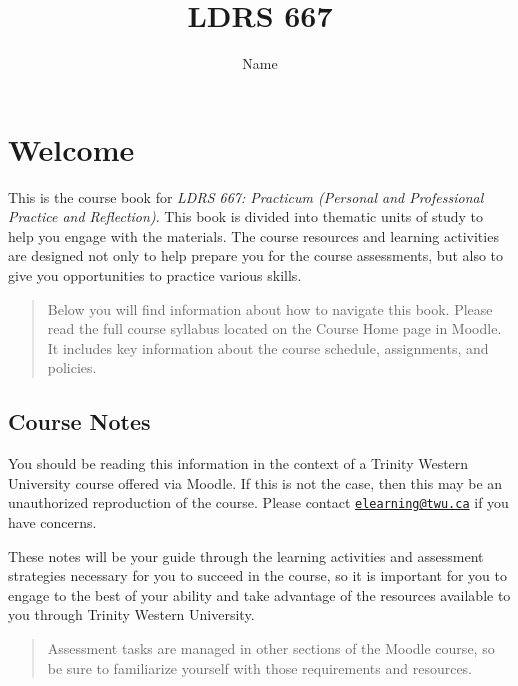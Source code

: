 \documentclass[
]{book}
\title{LDRS 667}
\author{Name}
\date{}
\begin{document}
\maketitle

{
\setcounter{tocdepth}{1}
\tableofcontents
}
\hypertarget{welcome}{%
\chapter*{Welcome}\label{welcome}}

This is the course book for \emph{LDRS 667: Practicum (Personal and Professional Practice and Reflection)}. This book is divided into thematic units of study to help you engage with the materials. The course resources and learning activities are designed not only to help prepare you for the course assessments, but also to give you opportunities to practice various skills.

\begin{quote}
Below you will find information about how to navigate this book. Please read the full course syllabus located on the Course Home page in Moodle. It includes key information about the course schedule, assignments, and policies.
\end{quote}

\hypertarget{course-notes}{%
\section*{Course Notes}\label{course-notes}}

You should be reading this information in the context of a Trinity Western University course offered via Moodle. If this is not the case, then this may be an unauthorized reproduction of the course. Please contact \href{mailto:elearning@twu.ca}{\nolinkurl{elearning@twu.ca}} if you have concerns.

These notes will be your guide through the learning activities and assessment strategies necessary for you to succeed in the course, so it is important for you to engage to the best of your ability and take advantage of the resources available to you through Trinity Western University.

\begin{quote}
Assessment tasks are managed in other sections of the Moodle course, so be sure to familiarize yourself with those requirements and resources.
\end{quote}
\end{document}
